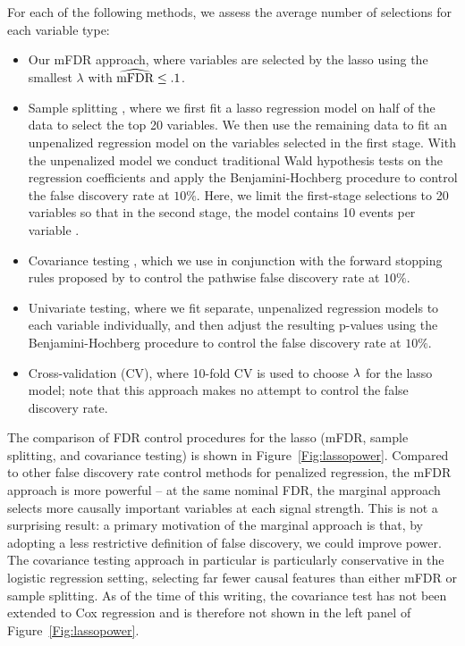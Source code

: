 
For each of the following methods, we assess the average number of selections for each variable type:
\begin{itemize}[labelindent=0.5cm, leftmargin=*]
\item Our mFDR approach, where variables are selected by the lasso using the smallest $\lambda$ with $\widehat{\textrm{mFDR}} \leq .1$.
\item Sample splitting \citep{Sample_Splitting}, where we first fit a lasso regression model on half of the data to select the top 20 variables. We then use the remaining data to fit an unpenalized regression model on the variables selected in the first stage. With the unpenalized model we conduct traditional Wald hypothesis tests on the regression coefficients and apply the Benjamini-Hochberg procedure \citep{BH_1995} to control the false discovery rate at $10\%$. Here, we limit the first-stage selections to 20 variables so that in the second stage, the model contains 10 events per variable \citep{peduzzi_epv}.
\item Covariance testing \citep{CovTest}, which we use in conjunction with the forward stopping rules proposed by \citet{GSell2016} to control the pathwise false discovery rate at $10\%$. 
\item Univariate testing, where we fit separate, unpenalized regression models to each variable individually, and then adjust the resulting p-values using the Benjamini-Hochberg procedure to control the false discovery rate at $10\%$.
\item Cross-validation (CV), where 10-fold CV is used to choose $\lambda$ for the lasso model; note that this approach makes no attempt to control the false discovery rate.
\end{itemize}

The comparison of FDR control procedures for the lasso (mFDR, sample splitting, and covariance testing) is shown in Figure~\ref{Fig:lassopower}.  Compared to other false discovery rate control methods for penalized regression, the mFDR approach is more powerful -- at the same nominal FDR, the marginal approach selects more causally important variables at each signal strength.  This is not a surprising result: a primary motivation of the marginal approach is that, by adopting a less restrictive definition of false discovery, we could improve power.  The covariance testing approach in particular is particularly conservative in the logistic regression setting, selecting far fewer causal features than either mFDR or sample splitting.  As of the time of this writing, the covariance test has not been extended to Cox regression and is therefore not shown in the left panel of Figure~\ref{Fig:lassopower}.

